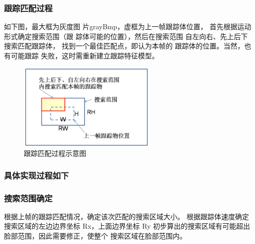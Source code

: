\documentclass[12pt,hyperref,a4paper,UTF8]{ctexart}
\begin{document}
        \subsubsection*{\large \textbf{跟踪匹配过程}}
        如下图，最大框为灰度图
        片grayBmp，虚框为上一帧跟踪体位置，
        首先根据运动形式确定搜索范围（跟
        踪体可能的位置），然后在搜索范围
        自左向右、先上后下搜索匹配跟踪体，
        找到一个最佳匹配点，即认为本帧的
        跟踪体的位置。当然，也有可能跟踪
        失败，这时需重新建立跟踪特征模型。


        \begin{figure}[H]
            \centering
            \includegraphics[width=0.6\textwidth]{./figures/fig/image12.png}
            \caption{跟踪匹配过程示意图}
            \label{fig:eye_nose_tracking}
        \end{figure}


        \subsubsection*{\Large \textbf{具体实现过程如下}}


        \subsubsection*{\large \textbf{搜索范围确定}}

        根据上帧的跟踪匹配情况，确定该次匹配的搜索区域大小。
        根据跟踪体速度确定搜索区域的左边边界坐标 Rx，上面边界坐标 Ry
        初步算出的搜索区域有可能超出脸部范围，因此需要修正，使整个
        搜索区域在脸部范围内。
\end{document}
